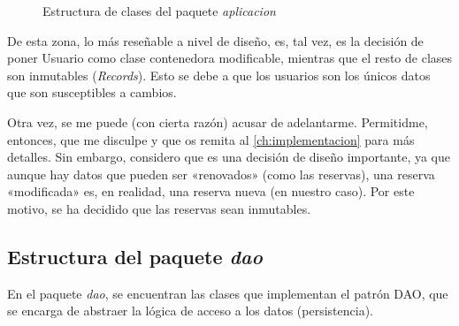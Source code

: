 \begin{figure}[h]
    \centering
    \caption{Estructura de clases del paquete \textit{aplicacion}}
    \label{fig:estructura_aplicacion}
\end{figure}

De esta zona, lo más reseñable a nivel de diseño, es, tal vez, es la decisión de poner Usuario
como clase contenedora modificable, mientras que el resto de clases son inmutables (\textit{Records}).
Esto se debe a que los usuarios son los únicos datos que son susceptibles a cambios.

Otra vez, se me puede (con cierta razón) acusar de adelantarme.
Permitidme, entonces, que me disculpe y que os remita al \autoref{ch:implementacion} para más detalles.
Sin embargo, considero que es una decisión de diseño importante,
ya que aunque hay datos que pueden ser «renovados» (como las reservas),
una reserva «modificada» es, en realidad, una reserva nueva (en nuestro caso).
Por este motivo, se ha decidido que las reservas sean inmutables.

\subsection{Estructura del paquete \textit{dao}}\label{subsec:estructura_del_paquete_dao}
En el paquete \textit{dao}, se encuentran las clases que implementan el patrón DAO,
que se encarga de abstraer la lógica de acceso a los datos (persistencia).

